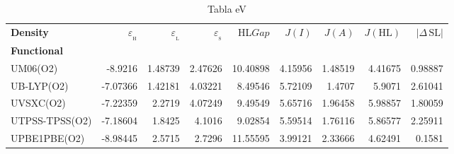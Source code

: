 \documentclass[preprint,landscape,12pt]{elsarticle}
\begin{document}
	\begin{table}
		\caption{ Tabla eV}
		\centering
		\footnotesize
		\begin{tabular}{lrrrrrrrr}
			\hline
			\textbf{Density}    & $\varepsilon_{_{\mathrm{H}}}$	& $\varepsilon_{_{\mathrm{L}}}$  & $\varepsilon_{_{\mathrm{S}}}$& HL$Gap$ & $J(I)$ & $J(A)$ & $J(\mathrm{HL})$  & \textbf{$\left|\Delta\,\mathrm{SL}\right|$}  \\
			\textbf{Functional} &   &  &     &   &  &  &  &  \\
			\hline \hline 

UM06(O2) & -8.9216 & 1.48739 & 2.47626 & 10.40898 & 4.15956 & 1.48519 & 4.41675 & 0.98887\\
UB-LYP(O2) & -7.07366 & 1.42181 & 4.03221 & 8.49546 & 5.72109 & 1.4707 & 5.9071 & 2.61041\\
UVSXC(O2) & -7.22359 & 2.2719 & 4.07249 & 9.49549 & 5.65716 & 1.96458 & 5.98857 & 1.80059\\
UTPSS-TPSS(O2) & -7.18604 & 1.8425 & 4.1016 & 9.02854 & 5.59514 & 1.76116 & 5.86577 & 2.25911\\
UPBE1PBE(O2) & -8.98445 & 2.5715 & 2.7296 & 11.55595 & 3.99121 & 2.33666 & 4.62491 & 0.1581\\

	 		\hline
		\end{tabular}
			\label{tab:eV}
	\end{table}
\end{document}

